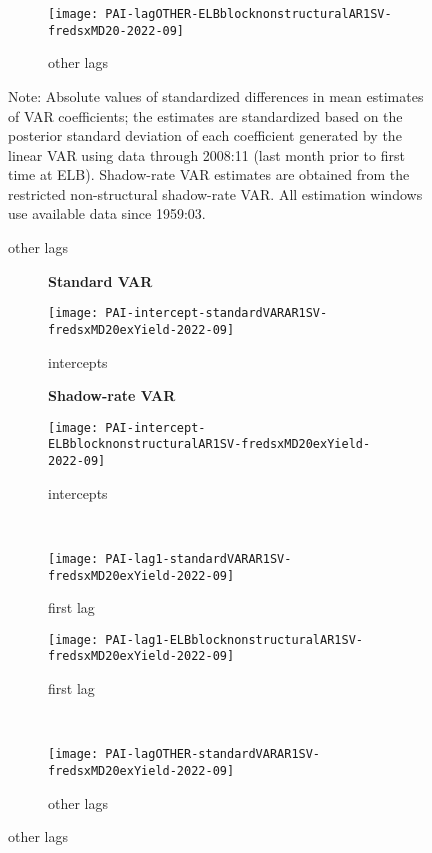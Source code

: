 \documentclass[12pt]{article}
\newlength{\picwid}
\begin{document}
\begin{figure}
\begin{center}
\begin{subfigure}[b]{\picwid}
\caption{other lags}
\label{subfig:pai:nonstructural:lagother}
\texttt{[image: PAI-lagOTHER-ELBblocknonstructuralAR1SV-fredsxMD20-2022-09]}
\end{subfigure}
\end{center}
Note: Absolute values of standardized differences in mean estimates of VAR coefficients; the estimates are standardized based on the posterior standard deviation of each coefficient generated by the linear VAR using data through 2008:11 (last month prior to first time at ELB). Shadow-rate VAR estimates are obtained from the restricted non-structural shadow-rate VAR. All estimation windows use available data since 1959:03.
\end{figure}

\begin{figure}
\setlength{\picwid}{.4\textwidth}
\caption{Parameter changes over time (ex yields)}
\label{fig:PAIsinceGFC0:exyield}
\begin{center}
\begin{subfigure}[b]{\picwid}
\centering\textbf{Standard VAR}\vspace{0.5\baselineskip}
\caption{intercepts}
\label{subfig:exyield:pai:standard:intercepts}
\texttt{[image: PAI-intercept-standardVARAR1SV-fredsxMD20exYield-2022-09]}
\end{subfigure}
\quad
\begin{subfigure}[b]{\picwid}
\centering\textbf{Shadow-rate VAR}\vspace{0.5\baselineskip}
\caption{intercepts}
\label{subfig:exyield:pai:nonstructural:intercepts}
\texttt{[image: PAI-intercept-ELBblocknonstructuralAR1SV-fredsxMD20exYield-2022-09]}
\end{subfigure}
\\
\begin{subfigure}[b]{\picwid}
\caption{first lag}
\label{subfig:exyield:pai:standard:lag1}
\texttt{[image: PAI-lag1-standardVARAR1SV-fredsxMD20exYield-2022-09]}
\end{subfigure}
\quad
\begin{subfigure}[b]{\picwid}
\caption{first lag}
\label{subfig:exyield:pai:nonstructural:lag1}
\texttt{[image: PAI-lag1-ELBblocknonstructuralAR1SV-fredsxMD20exYield-2022-09]}
\end{subfigure}
\\
\begin{subfigure}[b]{\picwid}
\caption{other lags}
\label{subfig:exyield:pai:standard:lagother}
\texttt{[image: PAI-lagOTHER-standardVARAR1SV-fredsxMD20exYield-2022-09]}

\end{subfigure}
\end{center}
\end{figure}
\end{document}
